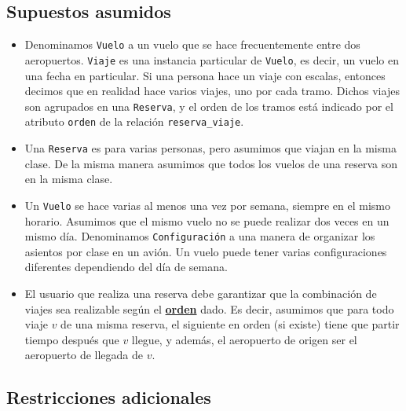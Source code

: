 \documentclass[a4paper,10pt]{article}
\begin{document}
\newpage

\subsection{Supuestos asumidos}

\begin{itemize}
 \item Denominamos \texttt{Vuelo} a un vuelo que se hace frecuentemente entre dos aeropuertos. \texttt{Viaje} es una instancia particular de \texttt{Vuelo}, es decir, un vuelo en una fecha en particular. Si una persona hace un viaje con escalas, entonces decimos que en realidad hace varios viajes, uno por cada tramo. Dichos viajes son agrupados en una \texttt{Reserva}, y el orden de los tramos est\'a indicado por el atributo \texttt{orden} de la relaci\'on \texttt{reserva\_viaje}.

  \item Una \texttt{Reserva} es para varias personas, pero asumimos que viajan en la misma clase. De la misma manera asumimos que todos los vuelos de una reserva son en la misma clase.

  \item Un \texttt{Vuelo} se hace varias al menos una vez por semana, siempre en el mismo horario. Asumimos que el mismo vuelo no se puede realizar dos veces en un mismo día. Denominamos \texttt{Configuración} a una manera de organizar los asientos por clase en un avión. Un vuelo puede tener varias configuraciones diferentes dependiendo del día de semana.
    
  \item El usuario que realiza una reserva debe garantizar que la combinación de viajes sea realizable según el \underline{\textbf{orden}} dado. Es decir, asumimos que para todo viaje $v$ de una misma reserva, el siguiente en orden (si existe) tiene que partir tiempo después que $v$ llegue, y además, el aeropuerto de origen ser el aeropuerto de llegada de $v$.
  
\end{itemize}

\subsection{Restricciones adicionales}
\end{document}
